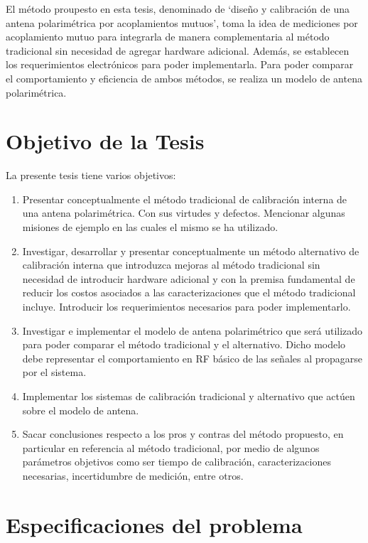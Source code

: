 El método proupesto en esta tesis, denominado de \enquote*{diseño y calibración de una antena polarimétrica por 
acoplamientos mutuos}, toma la idea de mediciones por acoplamiento mutuo \cite{Agrawal2003}\cite{Shipley2000} \cite{Aumann1989}
\cite{Chen2012} para integrarla de manera complementaria al método tradicional sin necesidad de agregar hardware adicional. 
Además, se establecen los requerimientos electrónicos para poder implementarla. Para poder comparar el comportamiento y 
eficiencia de ambos métodos, se realiza un modelo de antena polarimétrica.

\section{Objetivo de la Tesis} \label{sc:objective}

La presente tesis tiene varios objetivos:

\begin{enumerate}
    \item Presentar conceptualmente el método tradicional de calibración interna de una antena polarimétrica. Con sus 
		virtudes y defectos. Mencionar algunas misiones de ejemplo en las cuales el mismo se ha utilizado.
    \item Investigar, desarrollar y presentar conceptualmente un método alternativo de calibración interna que introduzca
		mejoras al método tradicional sin necesidad de introducir hardware adicional y con la premisa fundamental de
		reducir los costos asociados a las caracterizaciones que el método tradicional incluye. Introducir los
		requerimientos necesarios para poder implementarlo.
    \item Investigar e implementar el modelo de antena polarimétrico que será utilizado para poder comparar el 
		método tradicional y el alternativo. Dicho modelo debe representar el comportamiento en RF básico de las señales al 
		propagarse por el sistema.
    \item Implementar los sistemas de calibración tradicional y alternativo que actúen sobre el modelo de antena. 
    \item Sacar conclusiones respecto a los pros y contras del método propuesto, en particular en referencia al método
		tradicional, por medio de algunos parámetros objetivos como ser tiempo de calibración, caracterizaciones necesarias,
		incertidumbre de medición, entre otros.
\end{enumerate}


\section{Especificaciones del problema} \label{sc:specifications}

